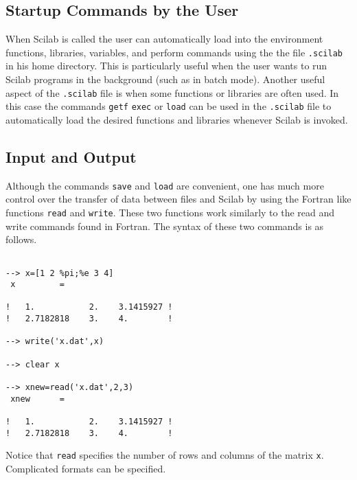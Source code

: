 \subsection{Startup Commands by the User}
\label{s5.2}

	When Scilab is called the user can automatically load
into the environment functions, libraries, variables, and perform
commands using the the file {\tt .scilab} in his home directory.  
This is particularly useful when the user wants to run Scilab programs
in the background (such as in batch mode).  Another useful aspect
of the {\tt .scilab} file is when some functions or libraries
are often used.  In this case the commands {\tt getf} {\tt exec} or
{\tt load} can be used
in the {\tt .scilab} file to automatically load the desired 
functions and libraries whenever Scilab is invoked.

\subsection{Input and Output}
\label{s5.3}

	Although the commands {\tt save} and {\tt load} are
convenient, one has much more control over the transfer of
data between files and Scilab by using the Fortran like functions 
{\tt read}
and {\tt write}.  
These two functions work similarly to the
read and write commands found in Fortran.  The syntax of these
two commands is as follows.  
\begin{verbatim}
 
--> x=[1 2 %pi;%e 3 4]
 x         =
 
!   1.           2.    3.1415927 !
!   2.7182818    3.    4.        !
 
--> write('x.dat',x)
 
--> clear x
 
--> xnew=read('x.dat',2,3)
 xnew      =
 
!   1.           2.    3.1415927 !
!   2.7182818    3.    4.        !
\end{verbatim}
Notice that {\tt read} specifies the number of rows and columns
of the matrix {\tt x}. Complicated formats can be specified. 

